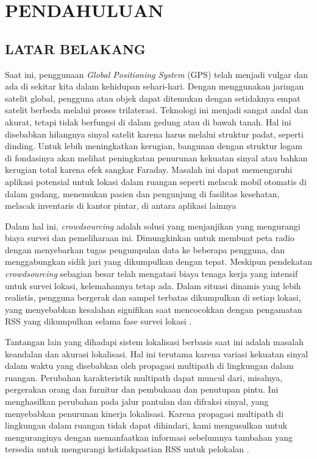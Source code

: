 \fancyhf{}
\fancyfoot[C]{\thepage}


\chapter{PENDAHULUAN}

\section{\uppercase{LATAR BELAKANG}}


\par Saat ini, penggunaan \textit{Global Positioning System} (GPS) telah menjadi vulgar dan ada di sekitar kita dalam kehidupan sehari-hari. Dengan menggunakan jaringan satelit global, pengguna atau objek dapat ditemukan dengan setidaknya empat satelit berbeda melalui proses trilaterasi. Teknologi ini menjadi sangat andal dan akurat, tetapi tidak berfungsi di dalam gedung atau di bawah tanah. Hal ini disebabkan hilangnya sinyal satelit karena harus melalui struktur padat, seperti dinding. Untuk lebih meningkatkan kerugian, bangunan dengan struktur logam di fondasinya akan melihat peningkatan penurunan kekuatan sinyal atau bahkan kerugian total karena efek sangkar Faraday. Masalah ini dapat memengaruhi aplikasi potensial untuk lokasi dalam ruangan seperti melacak mobil otomatis di dalam gudang, menemukan pasien dan pengunjung di fasilitas kesehatan, melacak inventaris di kantor pintar, di antara aplikasi lainnya \citep{Santos2021}

\par Dalam hal ini, \textit{crowdsourcing} adalah solusi yang menjanjikan yang mengurangi biaya survei dan pemeliharaan ini. Dimungkinkan untuk membuat peta radio dengan menyebarkan tugas pengumpulan data ke beberapa pengguna, dan menggabungkan sidik jari yang dikumpulkan dengan tepat. Meskipun pendekatan \textit{crowdsourcing} sebagian besar telah mengatasi biaya tenaga kerja yang intensif untuk survei lokasi, kelemahannya tetap ada.  Dalam situasi dinamis yang lebih realistis, pengguna bergerak dan sampel terbatas dikumpulkan di setiap lokasi, yang menyebabkan kesalahan signifikan saat mencocokkan dengan pengamatan RSS yang dikumpulkan selama fase survei lokasi \citep{Sun2019}.

\par Tantangan lain yang dihadapi sistem lokalisasi berbasis \textit{ } saat ini adalah masalah keandalan dan akurasi lokalisasi. Hal ini terutama karena variasi kekuatan sinyal dalam waktu yang disebabkan oleh propagasi multipath di lingkungan dalam ruangan. Perubahan karakteristik multipath dapat muncul dari, misalnya, pergerakan orang dan furnitur dan pembukaan dan penutupan pintu. Ini menghasilkan perubahan pada jalur pantulan dan difraksi sinyal, yang menyebabkan penurunan kinerja lokalisasi. Karena propagasi multipath di lingkungan dalam ruangan tidak dapat dihindari, kami mengusulkan untuk menguranginya dengan memanfaatkan informasi sebelumnya tambahan yang tersedia untuk mengurangi ketidakpastian RSS untuk pelokalan \citep{Sun2019}.

